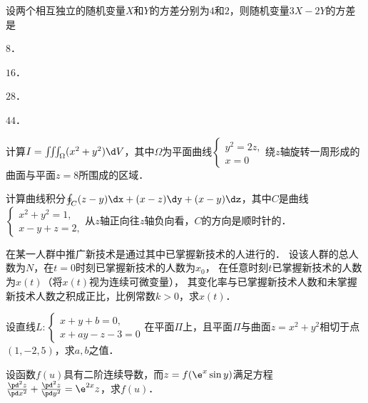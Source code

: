 \documentclass[plain,noanswer,medmath]{../../template/jnuexam}
\begin{document}
\begin{problem}
设两个相互独立的随机变量$X$和$Y$的方差分别为$4$和$2$，则随机变量$3X - 2Y$的方差是\pickout{}
\begin{abcd}
\item $8$．        
\item $16$．        
\item $28$．        
\item $44$．
\end{abcd}
\end{problem}




\begin{problem}
计算$I = \iiint_{\Omega}(x^2 + y^2) \d V$，其中$\Omega$为平面曲线$\begin{cases}
  y^2 = 2z, \\
  x = 0
\end{cases}$绕$z$轴旋转一周形成的曲面与平面$z = 8$所围成的区域．
\end{problem}


\begin{problem}
计算曲线积分$\oint_C (z - y)\dx + (x - z)\dy + (x - y)\dz$，其中$C$是曲线$\begin{cases}
  x^2 + y^2 = 1, \\
  x - y + z = 2,
\end{cases}$从$z$轴正向往$z$轴负向看，$C$的方向是顺时针的．
\end{problem}


\begin{problem}
在某一人群中推广新技术是通过其中已掌握新技术的人进行的．
设该人群的总人数为$N$，在$t = 0$时刻已掌握新技术的人数为$x_0$，
在任意时刻$t$已掌握新技术的人数为$x(t)$（将$x(t)$视为连续可微变量），
其变化率与已掌握新技术人数和未掌握新技术人数之积成正比，比例常数$k > 0$，求$x(t)$．
\end{problem}




\begin{problem}
设直线$L:\begin{cases}
  x + y + b = 0, \\
  x + ay - z - 3 = 0
\end{cases}$在平面$\Pi$上，且平面$\Pi$与曲面$z = x^2 + y^2$相切于点$(1, - 2,5)$，求$a,b$之值．
\end{problem}


\begin{problem}
设函数$f(u)$具有二阶连续导数，而$z = f(\e^x\sin y)$满足方程
$\frac{\pd^2 z}{\pd x^2} + \frac{\pd^2 z}{\pd y^2} = \e^{2x} z$，求$f(u)$．
\end{problem}
\end{document}

